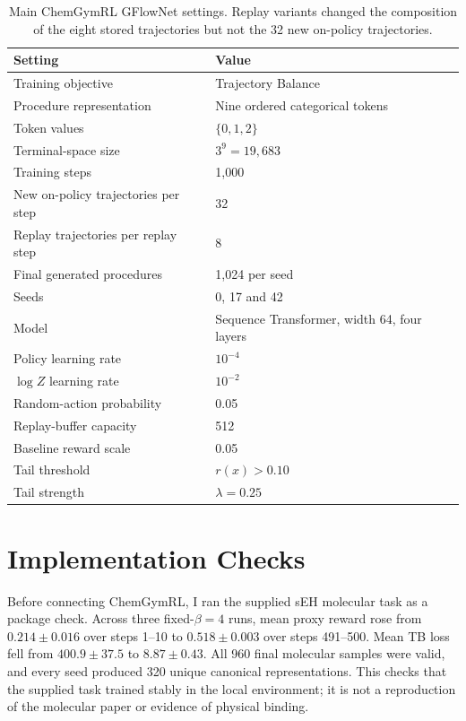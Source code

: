 \documentclass{article}
\begin{document}
\begin{table}[H]
\centering
\begin{tabular}{l l}
\hline
Setting & Value \\
\hline
Training objective & Trajectory Balance \\
Procedure representation & Nine ordered categorical tokens \\
Token values & $\{0,1,2\}$ \\
Terminal-space size & $3^9=19{,}683$ \\
Training steps & 1,000 \\
New on-policy trajectories per step & 32 \\
Replay trajectories per replay step & 8 \\
Final generated procedures & 1,024 per seed \\
Seeds & 0, 17 and 42 \\
Model & Sequence Transformer, width 64, four layers \\
Policy learning rate & $10^{-4}$ \\
$\log Z$ learning rate & $10^{-2}$ \\
Random-action probability & 0.05 \\
Replay-buffer capacity & 512 \\
Baseline reward scale & 0.05 \\
Tail threshold & $r(x)>0.10$ \\
Tail strength & $\lambda=0.25$ \\
\hline
\end{tabular}
\caption{Main ChemGymRL GFlowNet settings. Replay variants changed the composition of the eight stored trajectories but not the 32 new on-policy trajectories.}
\end{table}

\section{Implementation Checks}
\label{app:checks}

Before connecting ChemGymRL, I ran the supplied sEH molecular task as a package check. Across three fixed-$\beta=4$ runs, mean proxy reward rose from $0.214\pm0.016$ over steps 1--10 to $0.518\pm0.003$ over steps 491--500. Mean TB loss fell from $400.9\pm37.5$ to $8.87\pm0.43$. All 960 final molecular samples were valid, and every seed produced 320 unique canonical representations. This checks that the supplied task trained stably in the local environment; it is not a reproduction of the molecular paper or evidence of physical binding.
\end{document}
